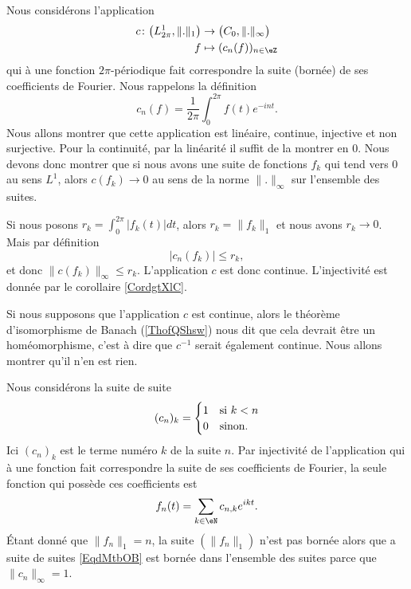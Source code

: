 Nous considérons l'application
\begin{equation}
    \begin{aligned}
        c\colon \big( L^1_{2\pi},\| . \|_1 \big)&\to \big( C_0,\| .\|_{\infty} \big) \\
        f&\mapsto (c_n(f))_{n\in \eZ} 
    \end{aligned}
\end{equation}
qui à une fonction \( 2\pi\)-périodique fait correspondre la suite (bornée) de ses coefficients de Fourier. Nous rappelons la définition
\begin{equation}
    c_n(f)=\frac{1}{ 2\pi }\int_0^{2\pi}f(t) e^{-int}.
\end{equation}
Nous allons montrer que cette application est linéaire, continue, injective et non surjective. Pour la continuité, par la linéarité il suffit de la montrer en \( 0\). Nous devons donc montrer que si nous avons une suite de fonctions \( f_k\) qui tend vers \( 0\) au sens \( L^1\), alors \( c(f_k)\to 0\) au sens de la norme \( \| . \|_{\infty}\) sur l'ensemble des suites.

Si nous posons \( r_k=\int_0^{2\pi}| f_k(t) |dt\), alors \( r_k=\| f_k \|_1\) et nous avons \( r_k\to 0\). Mais par définition
\begin{equation}
    | c_n(f_k) |\leq r_k,
\end{equation}
et donc \( \| c(f_k) \|_{\infty}\leq r_k\). L'application \( c\) est donc continue. L'injectivité est donnée par le corollaire \ref{CordgtXlC}. 

Si nous supposons que l'application \( c\) est continue, alors le théorème d'isomorphisme de Banach (\ref{ThofQShsw}) nous dit que cela devrait être un homéomorphisme, c'est à dire que \( c^{-1}\) serait également continue. Nous allons montrer qu'il n'en est rien.

Nous considérons la suite de suite
\begin{equation}    \label{EqdMtbOB}
    (c_n)_k=\begin{cases}
        1    &   \text{si \( k<n\)}\\
        0    &    \text{sinon}.
    \end{cases}
\end{equation}
Ici \( (c_n)_k\) est le terme numéro \( k\) de la suite \( n\). Par injectivité de l'application qui à une fonction fait correspondre la suite de ses coefficients de Fourier, la seule fonction qui possède ces coefficients est
\begin{equation}
    f_n(t)=\sum_{k\in \eN}c_{n,k} e^{ikt}.
\end{equation}
Étant donné que \( \| f_n \|_1=n\), la suite \( (\| f_n \|_1)\) n'est pas bornée alors que a suite de suites \eqref{EqdMtbOB} est bornée dans l'ensemble des suites parce que \( \| c_n \|_{\infty}=1\).
